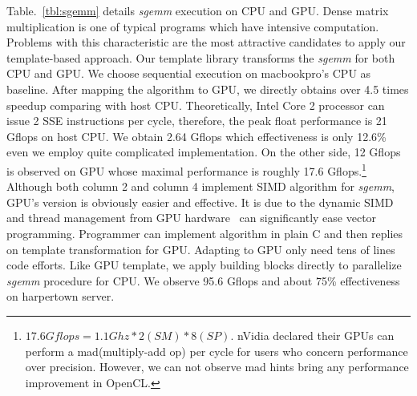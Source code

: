 Table.~\ref{tbl:sgemm} details \textit{sgemm} execution on CPU and GPU. Dense matrix
multiplication is one of  typical programs which have
intensive computation. Problems with this characteristic are the most
attractive candidates to apply our template-based approach.
Our template library transforms the \textit{sgemm} for both CPU and 
GPU. We choose sequential execution on macbookpro's CPU as
baseline. After mapping the algorithm to GPU, we directly obtains over
4.5 times speedup comparing with host CPU. Theoretically,  Intel Core
2 processor can issue 2 SSE instructions per cycle,  therefore, the
peak float performance is 21 Gflops on host CPU. We obtain 2.64 Gflops which
effectiveness is only 12.6\% even we employ quite complicated
implementation. On the other side, 12 Gflops is observed on GPU whose
maximal performance is roughly 17.6 Gflops.\footnote{$17.6Gflops = 1.1Ghz * 2(SM) *
  8(SP)$. nVidia declared their GPUs can perform a mad(multiply-add
  op) per cycle  for users who concern performance over precision. However, we can
  not observe mad hints bring any performance improvement in OpenCL. }
Although both column 2 and column 4 implement SIMD algorithm for
\textit{sgemm}, GPU's version is obviously easier and effective. It is
due to the dynamic SIMD and thread management from GPU
hardware~\cite{Fatahalian08} can significantly ease vector programming. Programmer can
implement algorithm in plain C and then replies on template
transformation for GPU.  Adapting to GPU only need tens of lines code
efforts. Like GPU template, we apply building blocks directly to parallelize \textit{sgemm} procedure for CPU. We observe 95.6 
Gflops and about 75\% effectiveness on harpertown server.


